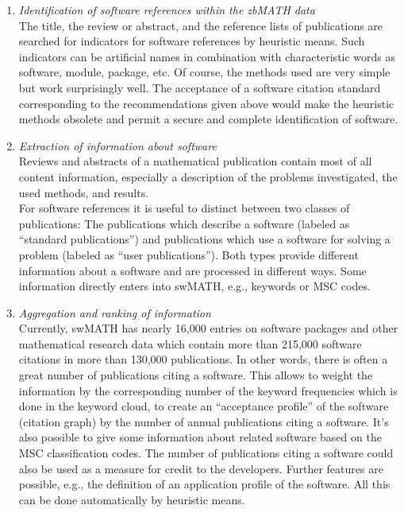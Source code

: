 \documentclass[12pt]{article}
\begin{document}
\begin{enumerate}
\item{\textit{Identification of software references within the zbMATH data}}\\
The title, the review or abstract, and the reference lists of publications are searched for indicators for software references by heuristic means. Such indicators can be artificial names in combination with characteristic words as software, module, package, etc.  Of course, the methods used are very simple but work surprisingly well. The acceptance of a software citation standard corresponding to the recommendations given above would make the heuristic methods obsolete and permit a secure and complete identification of software.
\item{\textit{Extraction of information about software}}\\
Reviews and abstracts of a mathematical publication contain most of all content information, especially a description of the problems investigated, the used methods, and results. \\ For software
references it is useful to distinct between two classes of publications: The publications which describe a software (labeled as  ``standard publications'') and publications which use a software for solving a problem (labeled as ``user publications''). Both types provide different information about a software and are processed in different ways. Some information directly enters into swMATH, e.g., keywords or MSC codes.
\item{\textit{Aggregation and ranking of information}}\\
Currently, swMATH has nearly 16,000 entries on software packages and other mathematical research data which contain more than 215,000 software citations in more than 130,000 publications. In other words, there is often a great number of publications citing a software. This allows to weight the information by the corresponding number of the keyword frequencies which is done in the keyword cloud, to create an ``acceptance profile'' of the software (citation graph) by the number of annual publications citing a software.  It's also possible to give some information about  related software based on the MSC classification codes. The number of publications citing a software could also be used as a measure for credit to the developers. Further features are possible, e.g., the definition of an application profile of the software. All this can be done automatically by heuristic means.
\end{enumerate}
\end{document}
